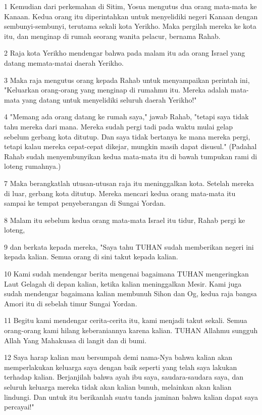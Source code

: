 \par 1 Kemudian dari perkemahan di Sitim, Yosua mengutus dua orang mata-mata ke Kanaan. Kedua orang itu diperintahkan untuk menyelidiki negeri Kanaan dengan sembunyi-sembunyi, terutama sekali kota Yerikho. Maka pergilah mereka ke kota itu, dan menginap di rumah seorang wanita pelacur, bernama Rahab.
\par 2 Raja kota Yerikho mendengar bahwa pada malam itu ada orang Israel yang datang memata-matai daerah Yerikho.
\par 3 Maka raja mengutus orang kepada Rahab untuk menyampaikan perintah ini, "Keluarkan orang-orang yang menginap di rumahmu itu. Mereka adalah mata-mata yang datang untuk menyelidiki seluruh daerah Yerikho!"
\par 4 "Memang ada orang datang ke rumah saya," jawab Rahab, "tetapi saya tidak tahu mereka dari mana. Mereka sudah pergi tadi pada waktu mulai gelap sebelum gerbang kota ditutup. Dan saya tidak bertanya ke mana mereka pergi, tetapi kalau mereka cepat-cepat dikejar, mungkin masih dapat disusul." (Padahal Rahab sudah menyembunyikan kedua mata-mata itu di bawah tumpukan rami di loteng rumahnya.)
\par 7 Maka berangkatlah utusan-utusan raja itu meninggalkan kota. Setelah mereka di luar, gerbang kota ditutup. Mereka mencari kedua orang mata-mata itu sampai ke tempat penyeberangan di Sungai Yordan.
\par 8 Malam itu sebelum kedua orang mata-mata Israel itu tidur, Rahab pergi ke loteng,
\par 9 dan berkata kepada mereka, "Saya tahu TUHAN sudah memberikan negeri ini kepada kalian. Semua orang di sini takut kepada kalian.
\par 10 Kami sudah mendengar berita mengenai bagaimana TUHAN mengeringkan Laut Gelagah di depan kalian, ketika kalian meninggalkan Mesir. Kami juga sudah mendengar bagaimana kalian membunuh Sihon dan Og, kedua raja bangsa Amori itu di sebelah timur Sungai Yordan.
\par 11 Begitu kami mendengar cerita-cerita itu, kami menjadi takut sekali. Semua orang-orang kami hilang keberaniannya karena kalian. TUHAN Allahmu sungguh Allah Yang Mahakuasa di langit dan di bumi.
\par 12 Saya harap kalian mau bersumpah demi nama-Nya bahwa kalian akan memperlakukan keluarga saya dengan baik seperti yang telah saya lakukan terhadap kalian. Berjanjilah bahwa ayah ibu saya, saudara-saudara saya, dan seluruh keluarga mereka tidak akan kalian bunuh, melainkan akan kalian lindungi. Dan untuk itu berikanlah suatu tanda jaminan bahwa kalian dapat saya percayai!"
